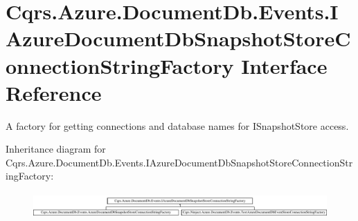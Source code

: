 \hypertarget{interfaceCqrs_1_1Azure_1_1DocumentDb_1_1Events_1_1IAzureDocumentDbSnapshotStoreConnectionStringFactory}{}\section{Cqrs.\+Azure.\+Document\+Db.\+Events.\+I\+Azure\+Document\+Db\+Snapshot\+Store\+Connection\+String\+Factory Interface Reference}
\label{interfaceCqrs_1_1Azure_1_1DocumentDb_1_1Events_1_1IAzureDocumentDbSnapshotStoreConnectionStringFactory}


A factory for getting connections and database names for I\+Snapshot\+Store access.  


Inheritance diagram for Cqrs.\+Azure.\+Document\+Db.\+Events.\+I\+Azure\+Document\+Db\+Snapshot\+Store\+Connection\+String\+Factory\+:\begin{figure}[H]
\begin{center}
\leavevmode
\includegraphics[height=0.963855cm]{interfaceCqrs_1_1Azure_1_1DocumentDb_1_1Events_1_1IAzureDocumentDbSnapshotStoreConnectionStringFactory}
\end{center}
\end{figure}
